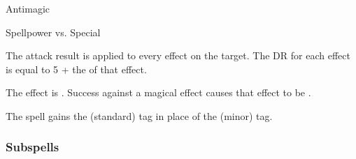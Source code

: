 \newpage
\begin{spellsection}{Antimagic}

\begin{spellcontent}

\begin{spelltargetinginfo}




\end{spelltargetinginfo}


\begin{spelleffects}




\begin{spellattack}{Spellpower vs. Special}


\spellspecial
The attack result is applied to every  effect on the target.
The DR for each effect is equal to 5 + the  of that effect.



\spellsuccess
The effect is .
Success against a magical effect causes that effect to be .



\end{spellattack}





\end{spelleffects}

\end{spellcontent}
\begin{spellfooter}


\end{spellfooter}
\begin{spellsubcontent}


\begin{spellcantrip}
The spell gains the  (standard) tag in place of the  (minor) tag.
\end{spellcantrip}


\end{spellsubcontent}
\end{spellsection}


\subsubsection{Subspells}


